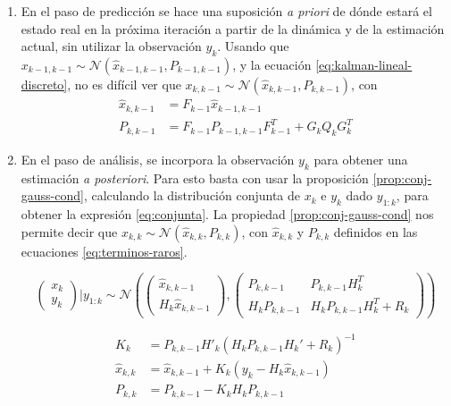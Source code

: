 \begin{enumerate}
\def\labelenumi{\arabic{enumi}.}
\item
  En el paso de predicción se hace una suposición \emph{a priori} de dónde estará el estado real en la próxima iteración a partir de la dinámica y de la estimación actual, sin utilizar la observación \(y_k\). Usando que \(x_{k-1,k-1} \sim \mathcal{N}(\hat{x}_{k-1,k-1}, P_{k-1,k-1})\), y la ecuación \ref{eq:kalman-lineal-discreto}, no es difícil ver que \(x_{k,k-1} \sim \mathcal{N}(\hat{x}_{k,k-1}, P_{k,k-1})\), con 
    \begin{equation}
    \begin{aligned}
    \hat{x}_{k,k-1} &= F_{k-1} \hat{x}_{k-1,k-1} \\
    P_{k,k-1} &= F_{k-1} P_{k-1,k-1} F_{k-1}^{T} + G_k Q_k G_k^T
    \end{aligned}
    \end{equation}
\item
  En el paso de análisis, se incorpora la observación \(y_k\) para obtener una estimación \emph{a posteriori}. Para esto basta con usar la proposición \ref{prop:conj-gauss-cond}, calculando la distribución conjunta de \(x_k\) e \(y_k\) dado \(y_{1:k}\), para obtener la expresión \ref{eq:conjunta}. La propiedad \ref{prop:conj-gauss-cond} nos permite decir que \(
    x_{k,k} \sim
     \mathcal{N} \left( \hat{x}_{k,k}, P_{k,k} \right)
    \), con \(\hat{x}_{k,k}\) y \(P_{k,k}\) definidos en las ecuaciones \ref{eq:terminos-raros}.
  
    \begin{equation}\label{eq:conjunta}
    \begin{pmatrix}
    x_k \\
    y_k
    \end{pmatrix} \Big| y_{1:k} \sim \mathcal{N}\left(
    \begin{pmatrix}
    \hat{x}_{k, k-1} \\
    H_k \hat{x}_{k,k-1}
    \end{pmatrix},
    \begin{pmatrix}
    P_{k,k-1} & P_{k,k-1} H^T_{k}\\
    H_{k}P_{k,k-1}  & H_{k}P_{k,k-1}H_{k}^T + R_k
    \end{pmatrix}  
    \right)
    \end{equation}

    \begin{equation}\label{eq:terminos-raros}
    \begin{aligned}
    K_k &= P_{k,k-1} H'_{k}(H_{k}P_{k,k-1}H_{k}' + R_k)^{-1}\\
    \hat{x}_{k,k} &= \hat{x}_{k, k-1} + K_k(y_k-H_k \hat{x}_{k,k-1}) \\
    P_{k,k} &= P_{k,k-1}- K_k H_{k}P_{k,k-1} \\
    \end{aligned}
    \end{equation}
\end{enumerate}
